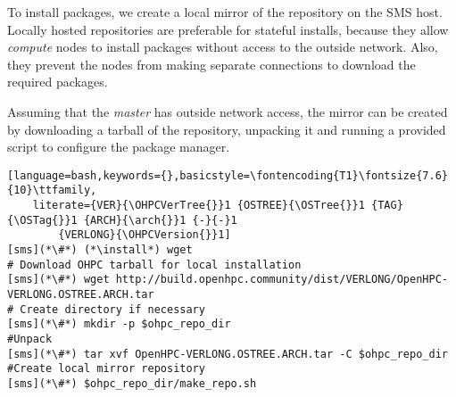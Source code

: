 To install \OHPC{} packages, we create a local mirror of the  \OHPC{} repository
on the SMS host. Locally hosted repositories are preferable for stateful
installs, because they allow {\em compute} nodes to install packages without
access to the outside network. Also, they  prevent the nodes from making  separate
connections to download the required packages. 

Assuming that the {\em master} has outside network access, the mirror can be
created  by downloading a tarball of the repository, unpacking it and running a
provided script to configure the package manager.

\begin{lstlisting}[language=bash,keywords={},basicstyle=\fontencoding{T1}\fontsize{7.6}{10}\ttfamily,
	literate={VER}{\OHPCVerTree{}}1 {OSTREE}{\OSTree{}}1 {TAG}{\OSTag{}}1 {ARCH}{\arch{}}1 {-}{-}1 
        {VERLONG}{\OHPCVersion{}}1]
[sms](*\#*) (*\install*) wget
# Download OHPC tarball for local installation
[sms](*\#*) wget http://build.openhpc.community/dist/VERLONG/OpenHPC-VERLONG.OSTREE.ARCH.tar
# Create directory if necessary
[sms](*\#*) mkdir -p $ohpc_repo_dir
#Unpack
[sms](*\#*) tar xvf OpenHPC-VERLONG.OSTREE.ARCH.tar -C $ohpc_repo_dir
#Create local mirror repository
[sms](*\#*) $ohpc_repo_dir/make_repo.sh
\end{lstlisting}
